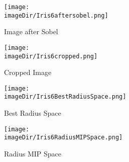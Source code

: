 \documentclass[11pt, a4paper, twoside]{article}   	%
\newcommand{\imageDir}{images}
\begin{document}
\begin{figure}[H]
	\centering
	\texttt{[image: \\imageDir/Iris6aftersobel.png]}
	\caption{Image after Sobel}
\end{figure}

\begin{figure}[H]
	\centering
	\texttt{[image: \\imageDir/Iris6cropped.png]}
	\caption{Cropped Image}
\end{figure}

\begin{figure}[H]
	\centering
	\texttt{[image: \\imageDir/Iris6BestRadiusSpace.png]}
	\caption{Best Radius Space}
\end{figure}

\begin{figure}[H]
	\centering
	\texttt{[image: \\imageDir/Iris6RadiusMIPSpace.png]}
	\caption{Radius MIP Space}
\end{figure}
\end{document}
